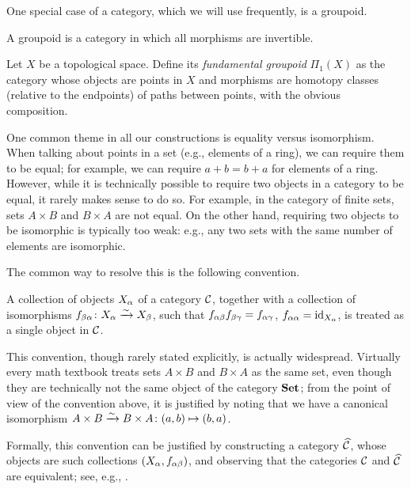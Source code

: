 One special case of a category, which we will use frequently, is a groupoid.
\begin{definition}
  A groupoid is a category in which all morphisms are invertible.
\end{definition}
\begin{example}\label{x:fundamental-groupoid}
  Let $X$ be a topological space. Define its \emph{fundamental
  groupoid} $\Pi_1(X)$ as the category whose objects
  are points in $X$ and morphisms are homotopy classes (relative to the
  endpoints) of paths between points, with the obvious composition.
\end{example}

One common theme in all our constructions is equality versus isomorphism. When
talking about points in a set (e.g., elements of a ring), we can require them to
be equal; for example, we can require $a+b=b+a$ for elements of a ring. However,
while it is technically possible to require two objects in a category to be
equal, it rarely makes sense to do so. For example, in the category of finite
sets, sets $A\times B$ and $B\times A$ are not equal. On the other hand,
requiring two objects to be isomorphic is typically too weak: e.g., any two sets
with the same number of elements are isomorphic.

The common way to resolve this is the following convention.
\begin{convention}\label{conv:canonical}
  A collection of objects $X_\alpha$ of a category $\mathcal{C}$, together with a
  collection of isomorphisms $f_{\beta\alpha}\colon X_\alpha \xrightarrow{\sim} X_\beta$, such that
  $f_{\alpha\beta}f_{\beta\gamma}=f_{\alpha\gamma}$, $f_{\alpha\alpha}=\operatorname{id}_{X_\alpha}$, is treated as a
  single object in $\mathcal{C}$.
\end{convention}
This convention, though rarely stated explicitly, is actually widespread.
Virtually every math textbook treats sets $A\times B$ and $B\times A$ as the
same set, even though they are technically not the same object of the category
$\mathbf{Set}$; from the point of view of the convention above, it is justified by
noting that we have a canonical isomorphism $A\times B\xrightarrow{\sim} B\times A\colon
(a,b)\mapsto (b,a)$.

Formally, this convention can be justified by constructing a category
$\widehat{\mathcal{C}}$, whose objects are such collections $(X_\alpha, f_{\alpha\beta})$, and
observing that the categories $\mathcal{C}$ and $\widehat{\mathcal{C}}$ are equivalent; see,
e.g., \cite[Lemma 1.1.12]{bakalov-kirillov}.


